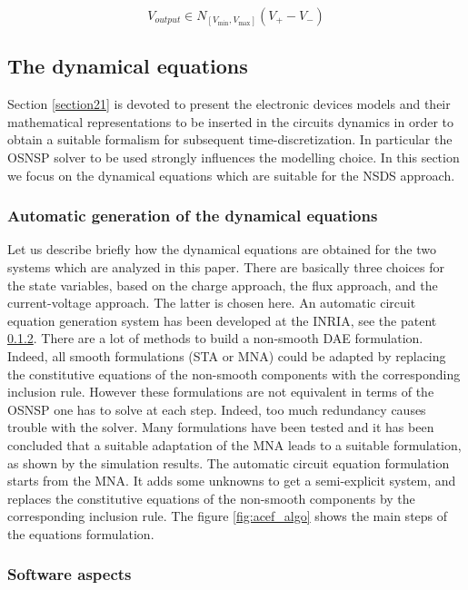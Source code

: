 \begin{equation}
V_{output} \in N_{[V_{\min},V_{\max}]}(V_{+}-V_{-}) 
\end{equation}



\subsection{The dynamical equations}
\label{section23}


Section \ref{section21} is devoted to present the electronic devices models and their mathematical representations to be inserted in the circuits dynamics in order to obtain a suitable formalism for subsequent time-discretization. In particular the OSNSP solver to be used strongly influences the modelling choice. In this section we focus on the dynamical equations which are suitable for the NSDS approach. 


\subsubsection{Automatic generation of the dynamical equations}

Let us describe briefly how the dynamical equations are obtained for the two systems which are analyzed in this paper. There are basically three choices for the state variables, based on the charge approach, the flux approach, and the current-voltage approach. The latter is chosen here. An automatic circuit equation generation system has been developed at the INRIA, see the patent \ref{}.  There are a lot of methods to build a non-smooth DAE formulation. Indeed, all smooth formulations (STA or MNA) could be adapted by replacing the constitutive equations of the non-smooth components
with the corresponding inclusion rule. However these formulations are not equivalent in terms of the OSNSP one has to solve at each step. Indeed, too much redundancy causes trouble with the solver. Many formulations have been tested and it has been concluded that a suitable adaptation of the MNA leads to a suitable formulation, as shown by the simulation results. The automatic circuit equation formulation starts from the MNA. It adds some unknowns to get a semi-explicit system, and replaces the constitutive equations of the non-smooth components by
the corresponding inclusion rule. The figure \ref{fig:acef_algo} shows the main steps of the equations formulation.

\subsubsection{Software aspects}



